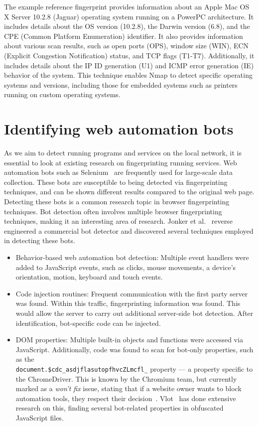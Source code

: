 The example reference fingerprint provides information about an Apple Mac OS X Server 10.2.8 (Jaguar) operating system running on a PowerPC architecture. It includes details about the OS version (10.2.8), the Darwin version (6.8), and the CPE (Common Platform Enumeration) identifier. It also provides information about various scan results, such as open ports (OPS), window size (WIN), ECN (Explicit Congestion Notification) status, and TCP flags (T1-T7). Additionally, it includes details about the IP ID generation (U1) and ICMP error generation (IE) behavior of the system. This technique enables Nmap to detect specific operating systems and versions, including those for embedded systems such as printers running on custom operating systems.

\section{Identifying web automation bots}
As we aim to detect running programs and services on the local network, it is essential to look at existing research on fingerprinting running services. 
Web automation bots such as Selenium~ are frequently used for large-scale data collection. These bots are susceptible to being detected via fingerprinting techniques, and can be shown different results compared to the original web page. 
Detecting these bots is a common research topic in browser fingerprinting techniques. Bot detection often involves multiple browser fingerprinting techniques, making it an interesting area of research. 
Jonker et al.~ reverse engineered a commercial bot detector and discovered several techniques employed in detecting these bots.

\begin{itemize}
    \item Behavior-based web automation bot detection: Multiple event handlers were added to JavaScript events, such as clicks, mouse movements, a device's orientation, motion, keyboard and touch events.
    \item Code injection routines: Frequent communication with the first party server was found. Within this traffic, fingerprinting information was found. This would allow the server to carry out additional server-side bot detection. After identification, bot-specific code can be injected.
    \item DOM properties: Multiple built-in objects and functions were accessed via JavaScript. Additionally, code was found to scan for bot-only properties, such as the \\\verb|document.$cdc_asdjflasutopfhvcZLmcfl_| property --- a property specific to the ChromeDriver.
    This is known by the Chromium team, but currently marked as a \emph{won't fix} issue, stating that if a website owner wants to block automation tools, they respect their decision~.
    Vlot~ has done extensive research on this, finding several bot-related properties in obfuscated JavaScript files. 
\end{itemize}


